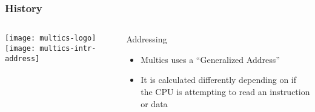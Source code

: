 \begin{frame}[plain]
	\frametitle{History}
	
	
	
	\begin{columns}
		
		\begin{column}{.5\textwidth}
			\texttt{[image: multics-logo]}
			\texttt{[image: multics-intr-address]}
			
			
			
		\end{column}
		
		\begin{column}{.5\textwidth}
			
			\Large
			Addressing
			\begin{itemize}
				\item  Multics uses a	“Generalized Address”
				\item  It is calculated
				differently depending
				on if the CPU is
				attempting to read an
				instruction or data

				
			\end{itemize}	
			
		\end{column}
		
		
	\end{columns}
	
	
\end{frame}



